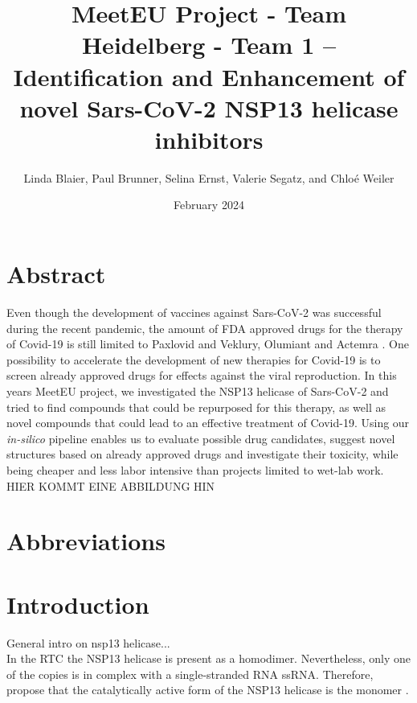 \documentclass[11pt, letterpaper, titlepage]{article}
\title{MeetEU Project - Team Heidelberg - Team 1 -- \\ Identification and Enhancement of novel Sars-CoV-2 NSP13 helicase inhibitors}
\author{Linda Blaier, Paul Brunner, Selina Ernst, Valerie Segatz, and Chlo\'{e} Weiler}
\date{February 2024}
\renewcommand{\cite}{\parencite}
\begin{document}
\maketitle

\ihead{\headmark}
\cfoot{\pagemark}   %

\section{Abstract}
Even though the development of vaccines against Sars-CoV-2 was successful during the recent pandemic, the amount of FDA approved drugs for the therapy of Covid-19 is still limited to Paxlovid and Veklury, Olumiant and Actemra \cite{FDA_COVID}. One possibility to accelerate the development of new therapies for Covid-19 is to screen already approved drugs for effects against the viral reproduction. In this years MeetEU project, we investigated the NSP13 helicase of Sars-CoV-2 and tried to find compounds that could be repurposed for this therapy, as well as novel compounds that could lead to an effective treatment of Covid-19. Using our \textit{in-silico} pipeline enables us to evaluate possible drug candidates, suggest novel structures based on already approved drugs and investigate their toxicity, while being cheaper and less labor intensive than projects limited to wet-lab work. 
HIER KOMMT EINE ABBILDUNG HIN


\FloatBarrier

\newpage
{\setlength{\parskip}{0.2cm}
\section*{Abbreviations}
    \begin{acronym}[LC-MS/MS23]


        
        
        
        
        
    \end{acronym}
}


\newpage

\section{Introduction}
General intro on nsp13 helicase... \\
In the \ac{RTC} the NSP13 helicase is present as a homodimer. Nevertheless, only one of the copies is in complex with a single-stranded RNA \ac{ssRNA}. Therefore, \textcite{Berta_2021} propose that the catalytically active form of the NSP13 helicase is the monomer \cite{Berta_2021}.  
\end{document}
